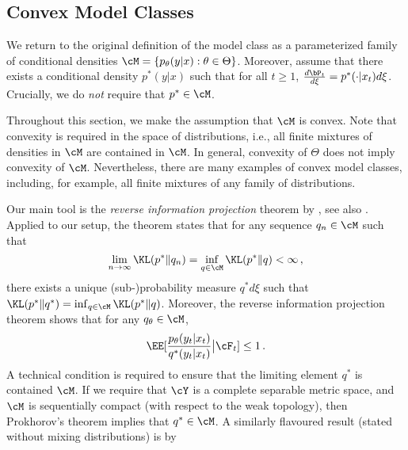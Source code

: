 

\subsection{Convex Model Classes}\label{sec:convex}
We return to the original definition of the model class as a parameterized family of conditional densities $\cM = \{ p_\theta(y|x) : \theta \in \Theta\}$. Moreover, assume that there exists a conditional density $p^*(y|x)$ such that for all $t \geq 1$, $\frac{d\bP_t}{d\xi} = p^*(\cdot|x_t) d\xi$. Crucially, we do \emph{not} require that $p^* \in \cM$. 

Throughout this section, we make the assumption that $\cM$ is convex. Note that convexity is required in the space of distributions, i.e., all finite mixtures of densities in $\cM$ are contained in $\cM$. In general, convexity of $\Theta$ does not imply convexity of $\cM$. Nevertheless, there are many examples of convex model classes, including, for example, all finite mixtures of any family of distributions. 

Our main tool is the \emph{reverse information projection} theorem by \citet{li1999estimation}, see also \citet{lardy2024reverse}. Applied to our setup, the theorem states that for any sequence $q_n \in \cM$ such that $$\lim_{n \rightarrow \infty} \KL(p^*\|q_n) = \inf_{q \in \cM} \KL(p^*\|q) < \infty\,,$$ there exists a unique (sub-)probability measure $q^* d\xi$ such that $\KL(p^*\|q^*) = \inf_{q \in \cM} \KL(p^*\|q)$. Moreover, the reverse information projection theorem shows that for any $q_\theta \in \cM$,
\begin{align}
    \EE[\frac{p_\theta(y_t|x_t)}{q^*(y_t|x_t)}\big | \cF_t] \leq 1 \,. \label{eq:rips-e-value}
\end{align}
A technical condition is required to ensure that the limiting element $q^*$ is contained $\cM$. If we require that $\cY$ is a complete separable metric space, and $\cM$ is sequentially compact (with respect to the weak topology), then Prokhorov's theorem implies that $q^* \in \cM$. A similarly flavoured result (stated without mixing distributions) is by \citet[Proposition 7]{wasserman2020universal}

